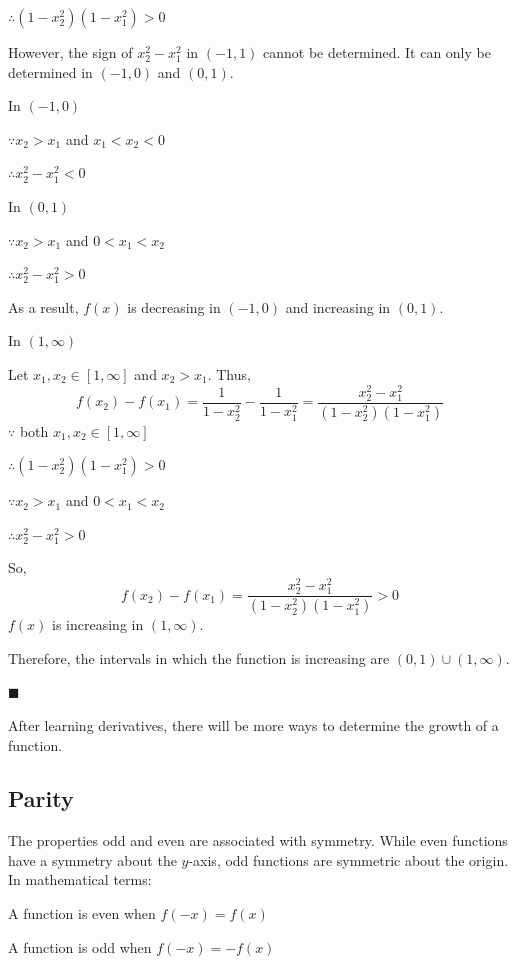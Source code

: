 $\therefore (1 - x_2^2)(1 - x_1^2) > 0$

However, the sign of $x_2^2 - x_1^2$ in $(-1, 1)$ cannot be determined. It can only be determined in $(-1, 0)$ and $(0, 1)$.

In $(-1, 0)$

$\because x_2 > x_1$ and $x_1 < x_2 < 0$

$\therefore x_2^2 - x_1^2 < 0$

In $(0, 1)$

$\because x_2 > x_1$ and $0 < x_1 < x_2$

$\therefore x_2^2 - x_1^2 > 0$

As a result, $f(x)$ is decreasing in $(-1, 0)$ and increasing in $(0, 1)$.

In $(1, \infty)$

Let $x_1, x_2 \in [1, \infty]$ and $x_2 > x_1$. Thus,
\[
f(x_2) - f(x_1) = \frac{1}{1 - x_2^2} - \frac{1}{1 - x_1^2} = \frac{x_2^2 - x_1^2}{(1 - x_2^2)(1 - x_1^2)}
\]
$\because$ both $x_1, x_2 \in [1, \infty]$

$\therefore (1 - x_2^2)(1 - x_1^2) > 0$

$\because x_2 > x_1$ and $0 < x_1 < x_2$

$\therefore x_2^2 - x_1^2 > 0$

So,
\[
f(x_2) - f(x_1) = \frac{x_2^2 - x_1^2}{(1 - x_2^2)(1 - x_1^2)} > 0
\]
$f(x)$ is increasing in $(1, \infty)$.

Therefore, the intervals in which the function is increasing are $(0, 1) \cup (1, \infty)$.

$\blacksquare$

After learning derivatives, there will be more ways to determine the growth of a function.

\subsection{Parity}
\label{sss:pari-aaba}

The properties odd and even are associated with symmetry. While even functions have a symmetry about the $y$-axis, odd functions are symmetric about the origin. In mathematical terms:

A function is even when $f(-x) = f(x)$ 

A function is odd when $f(-x) = -f(x)$

